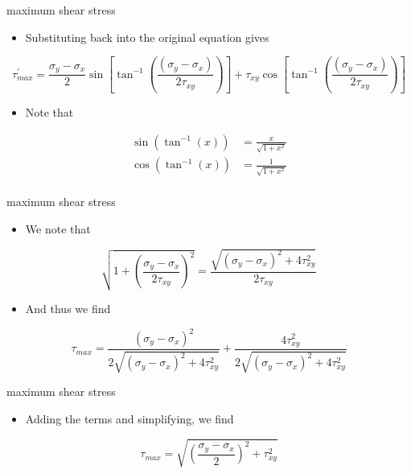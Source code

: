 \documentclass[
  letterpaper,
  ignorenonframetext,
  aspectratio=43,
  handout,
  12pt]{beamer}
\providecommand{\tightlist}{%
  \setlength{\itemsep}{0pt}\setlength{\parskip}{0pt}}
\providecommand{\tightlist}{%
\setlength{\itemsep}{0pt}\setlength{\parskip}{0pt}}
\begin{document}
\begin{frame}{maximum shear stress}
\protect\hypertarget{maximum-shear-stress-2}{}
\begin{itemize}
\tightlist
\item
  Substituting back into the original equation gives
\end{itemize}

\[\tau^\prime_{max} = \frac{\sigma_y - \sigma_x}{2}\sin \left[\tan ^{-1} \left(\frac{(\sigma_y-\sigma_x)}{2\tau_{xy}}\right)\right] + \tau_{xy} \cos \left[\tan ^{-1} \left(\frac{(\sigma_y-\sigma_x)}{2\tau_{xy}}\right)\right]\]

\begin{itemize}
\tightlist
\item
  Note that
\end{itemize}

\[\begin{aligned}
    \sin (\tan ^{-1} (x)) &= \frac{x}{\sqrt{1+x^2}}\\
    \cos (\tan ^{-1} (x)) &= \frac{1}{\sqrt{1+x^2}}\\
\end{aligned}\]
\end{frame}

\begin{frame}{maximum shear stress}
\protect\hypertarget{maximum-shear-stress-3}{}
\begin{itemize}
\tightlist
\item
  We note that
\end{itemize}

\[\sqrt{1+ \left(\frac{\sigma_y - \sigma_x}{2 \tau_{xy}}\right)^2} = \frac{\sqrt{(\sigma_y-\sigma_x)^2+4\tau_{xy}^2}}{2\tau_{xy}}\]

\begin{itemize}
\tightlist
\item
  And thus we find
\end{itemize}

\[\tau_{max} = \frac{(\sigma_y-\sigma_x)^2}{2 \sqrt{(\sigma_y-\sigma_x)^2+4\tau_{xy}^2}} + \frac{4\tau_{xy}^2}{2 \sqrt{(\sigma_y-\sigma_x)^2+4\tau_{xy}^2}}\]
\end{frame}

\begin{frame}{maximum shear stress}
\protect\hypertarget{maximum-shear-stress-4}{}
\begin{itemize}
\tightlist
\item
  Adding the terms and simplifying, we find
\end{itemize}

\[\tau_{max} = \sqrt{\left(\frac{\sigma_y-\sigma_x}{2}\right)^2+\tau_{xy}^2}\]
\end{frame}
\end{document}

